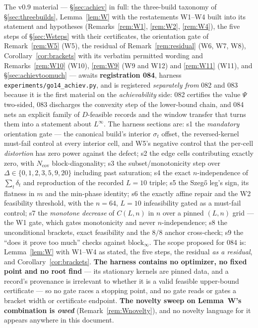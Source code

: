 \documentclass[11pt]{article}
\theoremstyle{definition}
\theoremstyle{remark}
\begin{document}
The v0.9 material --- \S\ref{sec:achiev} in full: the three-build
taxonomy of \S\ref{sec:threebuilds}, Lemma~\ref{lem:W} with the
restatements W1--W4 built into its statement and hypotheses
(Remarks~\ref{rem:W1}, \ref{rem:W2}, \ref{rem:W4}), the five steps of
\S\ref{sec:Wsteps} with their certificates, the orientation gate of
Remark~\ref{rem:W5} (W5), the residual of Remark~\ref{rem:residual}
(W6, W7, W8), Corollary~\ref{cor:brackets} with its verbatim permitted
wording and Remarks~\ref{rem:W10} (W10), \ref{rem:W9} (W9 and W12) and
\ref{rem:W11} (W11), and \S\ref{sec:achievtoomuch} --- awaits
\textbf{registration 084}, harness
\texttt{experiments/go14\_achiev.py}, and is registered
\emph{separately from} 082 and 083 because it is the first material on
the \emph{achievability} side: 082 certifies the value $\Psi$
two-sided, 083 discharges the convexity step of the lower-bound chain,
and 084 nets an explicit family of $D$-feasible records and the
window transfer that turns them into a statement about $L^\infty$. The
harness sections are: s1 the \emph{mandatory} orientation gate --- the
canonical build's interior $\sigma_t$ offset, the reversed-kernel
must-fail control at every interior cell, and W5's negative control
that the per-cell \emph{distortion} has zero power against the defect;
s2 the edge cells contributing exactly zero, with $N_{\mathrm{cov}}$
block-diagonality; s3 the subset/monotonicity step over
$\Delta\in\{0,1,2,3,5,9,20\}$ including past saturation; s4 the exact
$n$-independence of $\sum_t\delta_t$ and reproduction of the recorded
$L=10$ triple; s5 the Szeg\H o leg's sign, its flatness in $m$ and the
min-phase identity; s6 the exactly affine repair and the W2 feasibility
threshold, with the $n=64$, $L=10$ infeasibility gated as a must-fail
control; s7 the \emph{monotone decrease} of $C(L,n)$ in $n$ over a
pinned $(L,n)$ grid --- the W1 gate, which gates monotonicity and never
$n$-independence; s8 the unconditional brackets, exact feasibility and
the $8/8$ anchor cross-check; s9 the ``does it prove too much'' checks
against $\mathrm{block}_\infty$. The scope proposed for 084 is:
Lemma~\ref{lem:W} with W1--W4 as stated, the five steps, the residual
\emph{as a residual}, and Corollary~\ref{cor:brackets}. \textbf{The
harness contains no optimizer, no fixed point and no root find} --- its
stationary kernels are pinned data, and a record's provenance is
irrelevant to whether it is a valid feasible upper-bound certificate ---
so no gate races a stopping point, and no gate reads or gates a bracket
width or certificate endpoint. \textbf{The novelty sweep on Lemma~W's
combination is \emph{owed}} (Remark~\ref{rem:Wnovelty}), and no novelty
language for it appears anywhere in this document.
\end{document}
